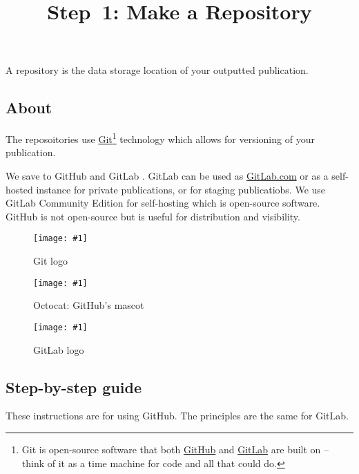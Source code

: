 \documentclass{article}
\newlength{\imgwidth}
\newcommand\scaledgraphics[2]{%
                
\settowidth{\imgwidth}{\texttt{[image: \#1]}}%
                
\setlength{\imgwidth}{\minof{\imgwidth}{#2\textwidth}}%
                
\texttt{[image: \#1]}%
                
}
\begin{document}
\title{Step 1: Make a Repository}

\maketitle


A repository is the data storage location of your outputted publication.


\subsection{About}\label{H4018151}



The reposoitories use \href{https://git-scm.com/}{Git}\footnote{Git is open-source software that both \href{https://github.com/}{GitHub} and \href{https://about.gitlab.com/}{GitLab} are built on – think of it as a time machine for code and all that could do.} technology which allows for versioning of your publication.


We save to GitHub and GitLab \autocite{PerkelJeffrey2016}. GitLab can be used as \href{GitLab.com}{GitLab.com} or as a self-hosted instance for private publications, or for staging publicatiobs. We use GitLab Community Edition for self-hosting which is open-source software. GitHub is not open-source but is useful for distribution and visibility.

\begin{figure}
\scaledgraphics{33ede307-f4a4-4660-92d2-92ccb1ef61d5.jpg}{0.5}
\caption*{Git logo}\label{F22345641}
\end{figure}

\begin{figure}
\scaledgraphics{5656f6ad-7ef0-4a57-9d81-9fc2ecfc77bc.png}{0.5}
\caption*{Octocat: GitHub's mascot}\label{F44428261}
\end{figure}

\begin{figure}
\scaledgraphics{6c70c3fd-31ab-446b-bfe3-5a7ee1e2f98f.png}{0.5}
\caption*{GitLab logo}\label{F88034391}
\end{figure}


\subsection{Step-by-step guide}\label{H1473428}



These instructions are for using GitHub. The principles are the same for GitLab.
\end{document}
